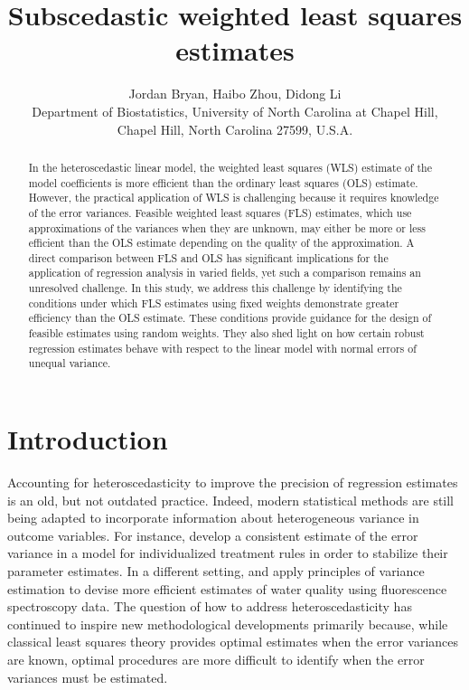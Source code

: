 \documentclass[12pt]{article}
\begin{document}
\def\spacingset#1{\renewcommand{\baselinestretch}%
{#1}\small\normalsize} \spacingset{1}


\title{\bf Subscedastic weighted least squares estimates}
\author{Jordan Bryan,
    Haibo Zhou, 
    Didong Li\\
    Department of Biostatistics, University of North Carolina at Chapel Hill,\\  Chapel Hill, North Carolina 27599, U.S.A.}
\date{}
\maketitle

\bigskip

\begin{abstract}
In the heteroscedastic linear model, the weighted least squares (WLS) estimate of the model coefficients is more efficient than the ordinary least squares (OLS) estimate. However, the practical application of WLS is challenging because it requires knowledge of the error variances. Feasible weighted least squares (FLS) estimates, which use approximations of the variances when they are unknown, may either be more or less efficient than the OLS estimate depending on the quality of the approximation. A direct comparison between FLS and OLS has significant implications for the application of regression analysis in varied fields, yet such a comparison remains an unresolved challenge. In this study, we address this challenge by identifying the conditions under which FLS estimates using fixed weights demonstrate greater efficiency than the OLS estimate. These conditions provide guidance for the design of feasible estimates using random weights. They also shed light on how certain robust regression estimates behave with respect to the linear model with normal errors of unequal variance.
\end{abstract}

\section{Introduction}\label{sec:intro}

Accounting for heteroscedasticity to improve the precision of regression estimates is an old, but not outdated practice. Indeed, modern statistical methods are still being adapted to incorporate information about heterogeneous variance in outcome variables. For instance, \cite{shah_stabilized_2023} develop a consistent estimate of the error variance in a model for individualized treatment rules in order to stabilize their parameter estimates. In a different setting, \cite{bryan_routine_2023} and \cite{bryan_linear_2024} apply principles of variance estimation to devise more efficient estimates of water quality using fluorescence spectroscopy data. The question of how to address heteroscedasticity has continued to inspire new methodological developments primarily because, while classical least squares theory provides optimal estimates when the error variances are known, optimal procedures are more difficult to identify when the error variances must be estimated.
\end{document}
